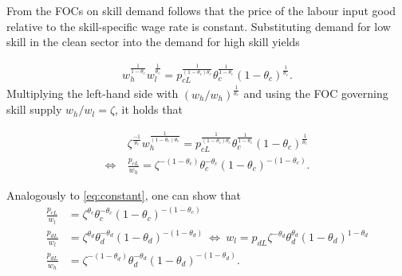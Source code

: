 

From the FOCs on skill demand follows that the price of the labour input good relative to the skill-specific wage rate is constant. Substituting demand for low skill in the clean sector into the demand for high skill yields

\begin{align*}
 w_{h}^{\frac{1}{1-\theta_c}}w_l^{\frac{1}{\theta_c}}= p_{cL}^\frac{1}{(1-\theta_c)\theta_c}\theta_c^\frac{1}{1-\theta_c}(1-\theta_c)^\frac{1}{\theta_c}.
\end{align*}
Multiplying the left-hand side with $(w_h/w_h)^\frac{1}{\theta_c}$ and
using the FOC governing skill supply $w_h/w_l=\zeta$, it holds that

\begin{align}\label{eq:constant}
& \zeta^\frac{-1}{\theta_c}w_h^\frac{1}{(1-\theta_c)\theta_c}= p_{cL}^\frac{1}{(1-\theta_c)\theta_c}\theta_c^\frac{1}{1-\theta_c}(1-\theta_c)^\frac{1}{\theta_c}\nonumber\\
	\Leftrightarrow\ & \frac{p_{cL}}{w_h}= \zeta^{-(1-\theta_c)}\theta_c^{-\theta_c}(1-\theta_c)^{-(1-\theta_c)}.
\end{align}

Analogously to \ref{eq:constant}, one can show that
\begin{align}
\frac{p_{cL}}{w_l}&=\zeta^{\theta_c}\theta_c^{-\theta_c}(1-\theta_c)^{-(1-\theta_c)}\label{eq:pcl_wl}\\
\frac{p_{dL}}{w_l}&=\zeta^{\theta_d}\theta_d^{-\theta_d}(1-\theta_d)^{-(1-\theta_d)}\ \Leftrightarrow\ w_l= p_{dL}\zeta^{-\theta_d}\theta_d^{\theta_d}(1-\theta_d)^{1-\theta_d}\label{eq:pdl_wl}\\
\frac{p_{dL}}{w_h}&=\zeta^{-(1-\theta_d)}\theta_d^{-\theta_d}(1-\theta_d)^{-(1-\theta_d)}.
\end{align}


